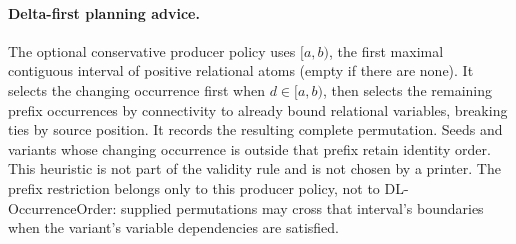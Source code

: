 \paragraph{Delta-first planning advice.}
The optional conservative  producer policy uses
$[a,b)$, the first maximal contiguous interval of positive relational atoms
(empty if there are none). It selects the changing occurrence first when
$d\in[a,b)$, then selects the remaining prefix occurrences
by connectivity to already bound relational variables, breaking ties by source
position.  It records the resulting complete permutation.  Seeds and variants
whose changing occurrence is outside that prefix retain identity order.
This heuristic is not part of the validity rule and is not chosen by a printer.
The prefix restriction belongs only to this producer policy, not to
DL-OccurrenceOrder: supplied permutations may cross that interval's boundaries
when the variant's variable dependencies are satisfied.

